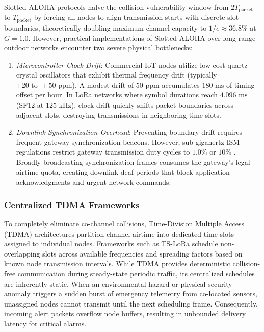 \documentclass[preprint,review,12pt]{elsarticle}
\begin{document}
Slotted ALOHA protocols \cite{polonelli2019slotted} halve the collision vulnerability window from $2 T_{\text{packet}}$ to $T_{\text{packet}}$ by forcing all nodes to align transmission starts with discrete slot boundaries, theoretically doubling maximum channel capacity to $1/e \approx 36.8\%$ at $G = 1.0$. However, practical implementations of Slotted ALOHA over long-range outdoor networks encounter two severe physical bottlenecks:
\begin{enumerate}
    \item \textit{Microcontroller Clock Drift}: Commercial IoT nodes utilize low-cost quartz crystal oscillators that exhibit thermal frequency drift (typically $\pm 20\text{ to }\pm 50\text{ ppm}$). A modest drift of $50\text{ ppm}$ accumulates $180\text{ ms}$ of timing offset per hour. In LoRa networks where symbol durations reach $4.096\text{ ms}$ (SF12 at $125\text{ kHz}$), clock drift quickly shifts packet boundaries across adjacent slots, destroying transmissions in neighboring time slots.
    \item \textit{Downlink Synchronization Overhead}: Preventing boundary drift requires frequent gateway synchronization beacons. However, sub-gigahertz ISM regulations restrict gateway transmission duty cycles to $1.0\%$ or $10\%$ \cite{adelantado2017understanding}. Broadly broadcasting synchronization frames consumes the gateway's legal airtime quota, creating downlink deaf periods that block application acknowledgments and urgent network commands.
\end{enumerate}

\subsubsection{Centralized TDMA Frameworks}
To completely eliminate co-channel collisions, Time-Division Multiple Access (TDMA) architectures partition channel airtime into dedicated time slots assigned to individual nodes. Frameworks such as TS-LoRa \cite{zorbas2020tslora} schedule non-overlapping slots across available frequencies and spreading factors based on known node transmission intervals. While TDMA provides deterministic collision-free communication during steady-state periodic traffic, its centralized schedules are inherently static. When an environmental hazard or physical security anomaly triggers a sudden burst of emergency telemetry from co-located sensors, unassigned nodes cannot transmit until the next scheduling frame. Consequently, incoming alert packets overflow node buffers, resulting in unbounded delivery latency for critical alarms.
\end{document}
